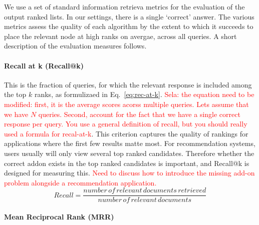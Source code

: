 \documentclass[11pt,oneside]{book}
\begin{document}

We use a set of standard information retrieva metrics for the evaluation of the output ranked lists. 
In our settings, there is a single `correct' answer. The various metrics assess the quality of each algorithm by the extent to which it succeeds to 
place the relevant node at high ranks on avergae, across all queries. A short description of the evaluation measures follows.

\paragraph{Recall at k (Recall@k)}
This is the fraction of queries, for which the relevant response is included among the top $k$ ranks, as formulizaed in Eq.~\eqref{eq:rec-at-k}. \textcolor{red}{Sela: the equation need to be modified: first, it is the average scores acorss multiple queries. Lets assume that we have $N$ queries. Second, account for the fact that we have a single correct response per query. You use a general definition of recall, but you should really used a formula for recal-at-k}. This criterion captures the quality of rankings for applications where the first few results matte most. 
For recommendation systems, users usually will only view several top ranked candidates. Therefore
whether the correct addon exists in the top ranked candidates is
important, and Recall@k is designed for measuring this. \textcolor{red}{Need to discuss how to introduce the missing add-on problem alongside a recommendation application.}
\begin{equation}
 Recall = \frac{number \, of \, relevant \, documents \, retrieved}{number \, of \, relevant \, documents}
\label{eq:rec-at-k}
\end{equation}

\paragraph{Mean Reciprocal Rank (MRR)}
\end{document}
